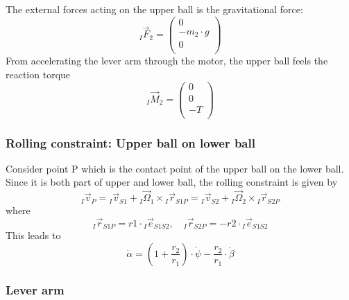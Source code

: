 \documentclass{article}
\begin{document}
The external forces acting on the upper ball is the gravitational force:
\begin{equation}
{}_I \vec{F}_{2} = \left( {\begin{array}{c} 0 \\ -m_2 \cdot g \\ 0 \\ \end{array} } \right)
\end{equation}
From accelerating the lever arm through the motor, the upper ball feels the reaction torque
\begin{equation}
{}_I \vec{M}_{2} = \left( {\begin{array}{c} 0 \\ 0 \\ -T \\ \end{array} } \right)
\end{equation}

\subsubsection{Rolling constraint: Upper ball on lower ball}
Consider point P which is the contact point of the upper ball on the lower ball.
Since it is both part of upper and lower ball, the rolling constraint is given by
\begin{equation}
{}_I \vec{v}_{P} = {}_I \vec{v}_{S1} + {}_I \vec{\Omega}_1 \times {}_I \vec{r}_{S1P} =
{}_I \vec{v}_{S2} + {}_I \vec{\Omega}_2 \times {}_I \vec{r}_{S2P}
\end{equation}
where
\begin{equation}
{}_I \vec{r}_{S1P} = r1 \cdot {}_I \vec{e}_{S1S2} , \quad
{}_I \vec{r}_{S2P} = -r2 \cdot {}_I \vec{e}_{S1S2}
\end{equation}
This leads to
\begin{equation}
\dot{\alpha} = \left( 1+\frac{r_2}{r_1} \right) \cdot \dot{\psi} -\frac{r_2}{r_1}  \cdot \dot{\beta}
\end{equation}

\subsubsection{Lever arm}
\end{document}
